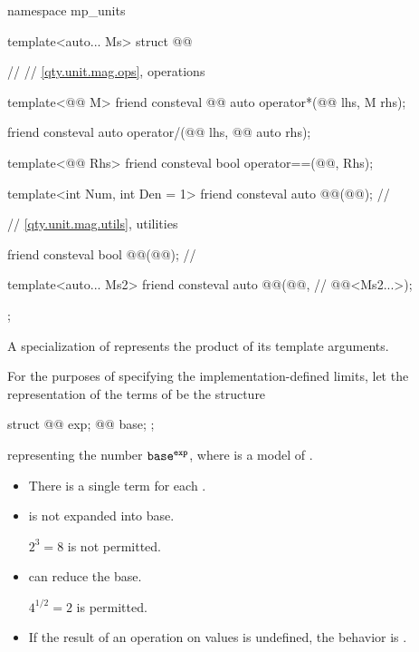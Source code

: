 \begin{codeblock}
namespace mp_units {

template<auto... Ms>
struct @@ {  // \expos
  // \ref{qty.unit.mag.ops}, operations

  template<@@ M>
  friend consteval @@ auto operator*(@@ lhs, M rhs);

  friend consteval auto operator/(@@ lhs, @@ auto rhs);

  template<@@ Rhs>
  friend consteval bool operator==(@@, Rhs);

  template<int Num, int Den = 1>
  friend consteval auto @@(@@);                         // \expos

  // \ref{qty.unit.mag.utils}, utilities

  friend consteval bool @@(@@);  // \expos

  template<auto... Ms2>
  friend consteval auto @@(@@,             // \expos
                                         @@<Ms2...>);
};

}
\end{codeblock}

\pnum
A specialization of 
represents the product of its template arguments.

\pnum
For the purposes of specifying the implementation-defined limits,
let the representation of the terms of  be the structure
\begin{codeblock}
struct {
  @@ exp;
  @@ base;
};
\end{codeblock}
representing the number $\texttt{\protect base}^{\texttt{\protect exp}}$,
where  is a model of .
\begin{itemize}
\item
There is a single term for each .
\item
{} is not expanded into base.
\begin{note}
$2^3 = 8$ is not permitted.
\end{note}
\item
{} can reduce the base.
\begin{note}
$4^{1/2} = 2$ is permitted.
\end{note}
\item
If the result of an operation on  values is undefined,
the behavior is
.
\end{itemize}

